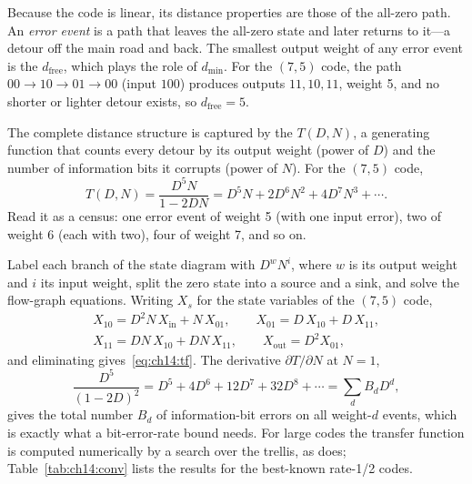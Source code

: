 Because the code is linear, its distance properties are those of the all-zero path. An
\emph{error event} is a path that leaves the all-zero state and later returns to it---a detour off
the main road and back. The smallest output weight of any error event is the 
$d_{\text{free}}$, which plays the role of $d_{\min}$. For the $(7,5)$ code, the path
$00\to10\to01\to00$ (input $100$) produces outputs $11,10,11$, weight 5, and no shorter or lighter
detour exists, so $d_{\text{free}}=5$.

The complete distance structure is captured by the  $T(D,N)$, a generating
function that counts every detour by its output weight (power of $D$) and the number of
information bits it corrupts (power of $N$). For the $(7,5)$ code,
\begin{equation}
T(D,N)=\frac{D^5N}{1-2DN}=D^5N+2D^6N^2+4D^7N^3+\cdots .
\label{eq:ch14:tf}
\end{equation}
Read it as a census: one error event of weight 5 (with one input error), two of weight 6 (each with
two), four of weight 7, and so on.

\begin{deeper}
Label each branch of the state diagram with $D^{w}N^{i}$, where $w$ is its output weight and $i$ its
input weight, split the zero state into a source and a sink, and solve the flow-graph equations.
Writing $X_s$ for the state variables of the $(7,5)$ code,
\begin{gather*}
X_{10}=D^2N\,X_{\text{in}}+N\,X_{01},\qquad X_{01}=D\,X_{10}+D\,X_{11},\\
X_{11}=DN\,X_{10}+DN\,X_{11},\qquad X_{\text{out}}=D^2X_{01},
\end{gather*}
and eliminating gives~\eqref{eq:ch14:tf}. The derivative $\partial T/\partial N$ at $N=1$,
\[
\frac{D^5}{(1-2D)^2}=D^5+4D^6+12D^7+32D^8+\cdots=\sum_dB_dD^d ,
\]
gives the total number $B_d$ of information-bit errors on all weight-$d$ events, which is exactly
what a bit-error-rate bound needs. For large codes the transfer function is computed numerically by
a search over the trellis, as  does; Table~\ref{tab:ch14:conv}
lists the results for the best-known rate-1/2 codes.
\end{deeper}

